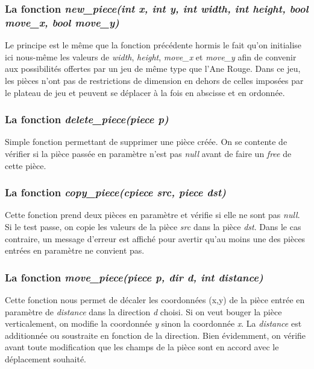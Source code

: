 \documentclass{report}
\begin{document}
\subsubsection*{La fonction \textit{new\_piece(int x, int y, int width, int height, bool move\_x, bool move\_y)}}
Le principe est le même que la fonction précédente hormis le fait qu'on initialise ici nous-même les valeurs de \textit{width}, \textit{height}, \textit{move\_x} et \textit{move\_y} afin de convenir aux possibilités offertes par un jeu de même type que l'Ane Rouge. Dans ce jeu, les pièces n'ont pas de restrictions de dimension en dehors de celles imposées par le plateau de jeu et peuvent se déplacer à la fois en abscisse et en ordonnée.
\subsubsection*{La fonction \textit{delete\_piece(piece p)}}
Simple fonction permettant de supprimer une pièce créée. On se contente de vérifier si la pièce passée en paramètre n'est pas \textit{null} avant de faire un \textit{free} de cette pièce.
\subsubsection*{La fonction \textit{copy\_piece(cpiece src, piece dst)}}
Cette fonction prend deux pièces en paramètre et vérifie si elle ne sont pas \textit{null}. Si le test passe, on copie les valeurs de la pièce \textit{src} dans la pièce \textit{dst}. Dans le cas contraire, un message d'erreur est affiché pour avertir qu'au moins une des pièces entrées en paramètre ne convient pas.
\subsubsection*{La fonction \textit{move\_piece(piece p, dir d, int distance)}}
Cette fonction nous permet de décaler les coordonnées (x,y) de la pièce entrée en paramètre de \textit{distance} dans la direction \textit{d} choisi. Si on veut bouger la pièce verticalement, on modifie la coordonnée \textit{y} sinon la coordonnée \textit{x}. La \textit{distance} est additionnée ou soustraite en fonction de la direction. Bien évidemment, on vérifie avant toute modification que les champs de la pièce sont en accord avec le déplacement souhaité.
\end{document}
